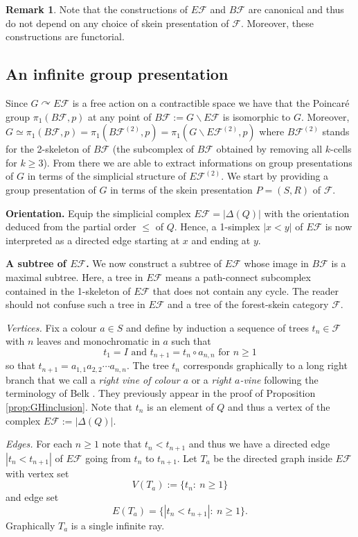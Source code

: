 \documentclass[a4paper, 12pt]{amsart}
\numberwithin{equation}{section}
\theoremstyle{definition}
\newtheorem{remark}[theorem]{Remark}
\newcommand{\act}{\curvearrowright}
\newcommand{\bs}{\backslash}
\newcommand{\cF}{\mathcal F}
\begin{document}
\begin{remark}
Note that the constructions of $E\cF$ and $B\cF$ are canonical and thus do not depend on any choice of skein presentation of $\cF$. 
Moreover, these constructions are functorial.
\end{remark}

\subsection{An infinite group presentation}

Since $G\act E\cF$ is a free action on a contractible space we have that the Poincar\'e group $\pi_1(B\cF,p)$ at any point of $B\cF:=G\bs E\cF$ is isomorphic to $G$.
Moreover, $G\simeq \pi_1(B\cF,p)=\pi_1(B\cF^{(2)},p)=\pi_1(G\bs E\cF^{(2)},p)$ where $B\cF^{(2)}$ stands for the 2-skeleton of $B\cF$ (the subcomplex of $B\cF$ obtained by removing all $k$-cells for $k\geq 3$).
From there we are able to extract informations on group presentations of $G$ in terms of the simplicial structure of $E\cF^{(2)}.$
We start by providing a group presentation of $G$ in terms of the skein presentation $P=(S,R)$ of $\cF$.

{\bf Orientation.} 
Equip the simplicial complex $E\cF=|\Delta(Q)|$ with the orientation deduced from the partial order $\leq$ of $Q$.
Hence, a 1-simplex $|x<y|$ of $E\cF$ is now interpreted as a directed edge starting at $x$ and ending at $y$.

{\bf A subtree of $E\cF$.}
We now construct a subtree of $E\cF$ whose image in $B\cF$ is a maximal subtree.
Here, a tree in $E\cF$ means a path-connect subcomplex contained in the 1-skeleton of $E\cF$ that does not contain any cycle.
The reader should not confuse such a tree in $E\cF$ and a tree of the forest-skein category $\cF$.

{\it Vertices.}
Fix a colour $a\in S$ and define by induction a sequence of trees $t_n\in\cF$ with $n$ leaves and monochromatic in $a$ such that 
$$t_1=I \text{ and } t_{n+1}= t_n\circ a_{n,n} \text{ for } n\geq 1$$
so that $t_{n+1}=a_{1,1}a_{2,2}\cdots a_{n,n}.$
The tree $t_n$ corresponds graphically to a long right branch that we call a {\it right vine of colour $a$} or a {\it right $a$-vine} following the terminology of Belk \cite[Section 1.3]{Belk-PhD}.
They previously appear in the proof of Proposition \ref{prop:GHinclusion}.
Note that $t_n$ is an element of $Q$ and thus a vertex of the complex $E\cF:=|\Delta(Q)|.$

{\it Edges.}
For each $n\geq 1$ note that $t_n<t_{n+1}$ and thus we have a directed edge $|t_n<t_{n+1}|$ of $E\cF$ going from $t_n$ to $t_{n+1}$. 
Let $T_a$ be the directed graph inside $E\cF$ with vertex set 
$$V(T_a):=\{t_n:\ n\geq 1\}$$ and edge set $$E(T_a)=\{ |t_n<t_{n+1}|:\ n\geq 1\}.$$
Graphically $T_a$ is a single infinite ray.
\end{document}
